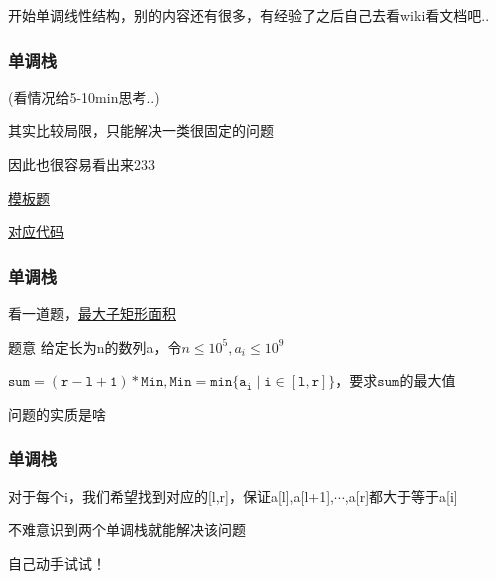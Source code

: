 \documentclass{beamer}
\begin{document}
  \begin{frame}

    开始单调线性结构，别的内容还有很多，有经验了之后自己去看wiki看文档吧..
    
    \vspace*{1\baselineskip}

    \frametitle{单调栈}

    (看情况给5-10min思考..)

    其实比较局限，只能解决一类很固定的问题

    因此也很容易看出来233

    \vspace*{1\baselineskip}
    
    \href{https://www.luogu.com.cn/problem/P5788}{模板题}

    \vspace*{1\baselineskip}

    \href{http://syh521.cn/file/monotone-stack.cpp}{对应代码}
  \end{frame}

  \begin{frame}


    \frametitle{单调栈}
    看一道题，\href{https://www.luogu.com.cn/problem/SP1805}{最大子矩形面积}

    \pause

    \begin{block}{题意}
      给定长为n的数列a，令$n\leq 10^5,a_i\leq 10^9$
  
      $\mathtt{sum=(r-l+1)*Min,Min=min\{a_i\mid i\in [l,r]\}}$，要求$\mathtt{sum}$的最大值

    \end{block}
    \pause
    问题的实质是啥
  \end{frame}

  \begin{frame}
    \frametitle{单调栈}
    
    对于每个i，我们希望找到对应的[l,r]，保证a[l],a[l+1],$\cdots$,a[r]都大于等于a[i]

    \pause

    \vspace*{1\baselineskip}
    
    不难意识到两个单调栈就能解决该问题
    
    \pause
    
    \vspace*{1\baselineskip}

    自己动手试试！
  \end{frame}
\end{document}
